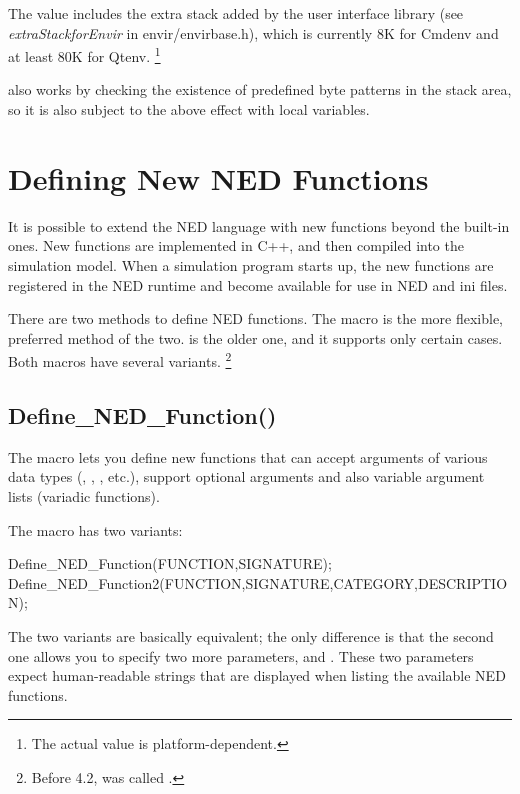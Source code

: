 The value includes the extra stack added by the user interface library
(see \textit{extraStackforEnvir} in
envir/envirbase.h), which is currently 8K for Cmdenv and at least 80K
for Qtenv.
  \footnote{The actual value is platform-dependent.}

 also works by checking the existence of predefined
byte patterns in the stack area, so it is also subject to the above
effect with local variables.


\section{Defining New NED Functions}
\label{sec:sim-lib:defining-ned-functions}

It is possible to extend the NED language with new functions beyond the
built-in ones. New functions are implemented in C++, and then compiled into
the simulation model. When a simulation program starts up, the new
functions are registered in the NED runtime and become available for use
in NED and ini files.

There are two methods to define NED functions. The
 macro is the more flexible, preferred method
of the two.  is the older one, and it
supports only certain cases. Both macros have several variants.
  \footnote{Before {\opp} 4.2,  was
  called .}

\subsection{Define\_NED\_Function()}
\label{sec:sim-lib:define-ned-function-macro}

The  macro lets you define new functions that
can accept arguments of various data types (, ,
, etc.), support optional arguments and also variable
argument lists (variadic functions).

The macro has two variants:

\begin{cpp}
Define_NED_Function(FUNCTION,SIGNATURE);
Define_NED_Function2(FUNCTION,SIGNATURE,CATEGORY,DESCRIPTION);
\end{cpp}

The two variants are basically equivalent; the only difference is that the
second one allows you to specify two more parameters,  and
. These two parameters expect human-readable strings that
are displayed when listing the available NED functions.

